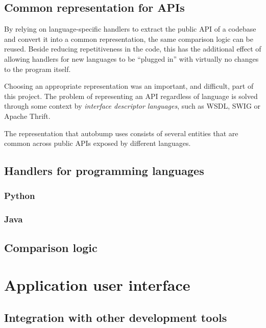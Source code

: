 \documentclass{l4proj}
\begin{document}
\subsection{Common representation for APIs}

By relying on language-specific handlers to extract the public API of
a codebase and convert it into a common representation, the same
comparison logic can be reused. Beside reducing repetitiveness in the
code, this has the additional effect of allowing handlers for new
languages to be ``plugged in'' with virtually no changes to the
program itself.

Choosing an appropriate representation was an important, and
difficult, part of this project. The problem of representing an API
regardless of language is solved through some context by
\textit{interface descriptor languages}, such as WSDL\cite{WSDL},
SWIG\cite{SWIG} or Apache Thrift\cite{Thrift}.


The representation that autobump uses consists of several entities
that are common across public APIs exposed by different languages.


\label{LanguageHandlers}
\subsection{Handlers for programming languages}

\subsubsection{Python}


\subsubsection{Java}

\subsection{Comparison logic}

\section{Application user interface}

\subsection{Integration with other development tools}
\end{document}

